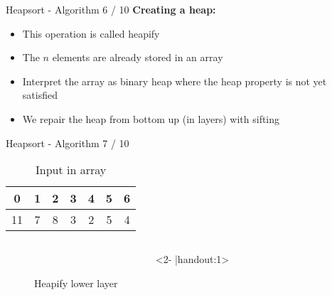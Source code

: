 
\begin{frame}{Heapsort - Algorithm 6 / 10}
  \textbf{Creating a heap:}
  \begin{itemize}
    \item
      This operation is called {\color{MainA}heapify}
    \item<2- |handout:1>
      The {\color{MainA}$n$} elements are already stored in an array
    \item<3- |handout:1>
      Interpret the array as binary heap where the {\color{MainA}heap property} is not yet satisfied
    \item<4- |handout:1>
      We repair the heap from bottom up (in layers) with {\color{MainA}sifting}
  \end{itemize}
\end{frame}


\begin{frame}{Heapsort - Algorithm 7 / 10}
  \vspace{-1.0em}
  \begin{table}[!h]%
    \caption{Input in array}%
    \label{tab:heapify_numbers}%
    \begin{tabular}{ccccccc}
      {\color{MainB}0}&
      {\color{MainB}1}&
      {\color{MainB}2}&
      {\color{MainB}3}&
      {\color{MainB}4}&
      {\color{MainB}5}&
      {\color{MainB}6}\\
      \hline
      \multicolumn{1}{|c}{11}&%
      \multicolumn{1}{|c}{7}&%
      \multicolumn{1}{|c}{8}&%
      \multicolumn{1}{|c}{3}&%
      \multicolumn{1}{|c}{2}&%
      \multicolumn{1}{|c}{5}&%
      \multicolumn{1}{|c|}{4}\\
      \hline
    \end{tabular}
  \end{table}
  \vspace*{-0.5em}
  \begin{centering}
    \begin{figure}[!h]%
      \begin{columns}%
        \begin{column}{0.425\textwidth}%
          \begin{adjustbox}{width=\linewidth}%
          \end{adjustbox}%
        \end{column}%
        \begin{column}{0.425\textwidth}<2- |handout:1>%
          \begin{adjustbox}{width=\linewidth}%
          \end{adjustbox}%
        \end{column}%
      \end{columns}%
      \caption{Heapify lower layer}%
      \label{fig:heapify_lower}%
    \end{figure}
  \end{centering}
\end{frame}

